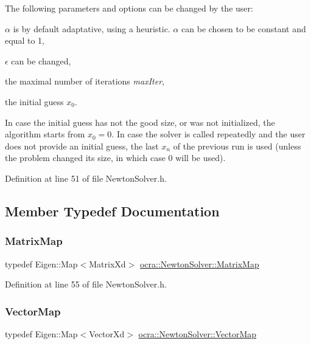 The following parameters and options can be changed by the user\+:
\begin{DoxyItemize}
\item $ \alpha $ is by default adaptative, using a heuristic. $ \alpha $ can be chosen to be constant and equal to 1,
\item $ \epsilon $ can be changed,
\item the maximal number of iterations {\itshape max\+Iter},
\item the initial guess $ x_0 $.
\end{DoxyItemize}

In case the initial guess has not the good size, or was not initialized, the algorithm starts from $ x_0=0 $. In case the solver is called repeatedly and the user does not provide an initial guess, the last $ x_n $ of the previous run is used (unless the problem changed its size, in which case 0 will be used). 

Definition at line 51 of file Newton\+Solver.\+h.



\subsection{Member Typedef Documentation}
\hypertarget{classocra_1_1NewtonSolver_a53e3463c336170efa3819d725c9b16e3}{}\label{classocra_1_1NewtonSolver_a53e3463c336170efa3819d725c9b16e3} 
\subsubsection{\texorpdfstring{Matrix\+Map}{MatrixMap}}
{\footnotesize\ttfamily typedef Eigen\+::\+Map$<$Matrix\+Xd$>$ \hyperlink{classocra_1_1NewtonSolver_a53e3463c336170efa3819d725c9b16e3}{ocra\+::\+Newton\+Solver\+::\+Matrix\+Map}}



Definition at line 55 of file Newton\+Solver.\+h.

\hypertarget{classocra_1_1NewtonSolver_aad21c090baadce638c9613f4b9d1d5c4}{}\label{classocra_1_1NewtonSolver_aad21c090baadce638c9613f4b9d1d5c4} 
\subsubsection{\texorpdfstring{Vector\+Map}{VectorMap}}
{\footnotesize\ttfamily typedef Eigen\+::\+Map$<$Vector\+Xd$>$ \hyperlink{classocra_1_1NewtonSolver_aad21c090baadce638c9613f4b9d1d5c4}{ocra\+::\+Newton\+Solver\+::\+Vector\+Map}}



